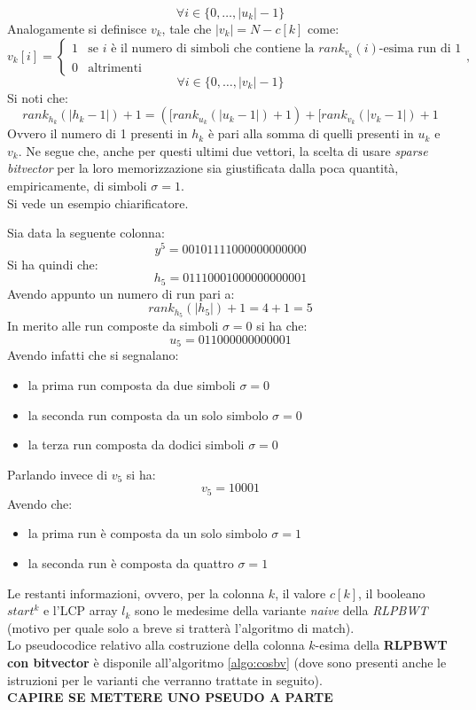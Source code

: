 \vspace{-5mm}
\[\forall i\in\{0,\ldots,|u_k|-1\}\]
Analogamente si definisce $v_k$, tale che $|v_k|=N-c[k]$ come:
\[v_k[i]=
  \begin{cases}
    1&\mbox{se }i \mbox{ è il numero di simboli che contiene la
    }rank_{v_k}(i)\mbox{-esima run di 1}\\
    0&\mbox{altrimenti}
  \end{cases},
\]
\vspace{-5mm}
\[\forall i\in\{0,\ldots,|v_k|-1\}\]
Si noti che:
\[rank_{h_k}(|h_k-1|)+1=([rank_{u_k}(|u_k-1|)+1)+[rank_{v_k}(|v_k-1|)+1\]
Ovvero il numero di 1 presenti in $h_k$ è pari alla somma di quelli presenti in
$u_k$ e $v_k$. Ne segue che, anche per questi ultimi due vettori, la scelta di
usare \textit{sparse bitvector} per la loro memorizzazione sia giustificata
dalla poca quantità, empiricamente, di simboli $\sigma=1$.\\
Si vede un esempio chiarificatore.
\begin{esempio}
  Sia data la seguente colonna:
  \[y^5=00101111000000000000\]
  Si ha quindi che:
  \[h_5=01110001000000000001\]
  Avendo appunto un numero di run pari a:
  \[rank_{h_5}(|h_5|)+1=4+1=5\]
  In merito alle run composte da simboli $\sigma=0$ si ha che:
  \[u_5=011000000000001\]
  Avendo infatti che si segnalano:
  \begin{itemize}
    \item la prima run composta da due simboli $\sigma=0$
    \item la seconda run composta da un solo simbolo $\sigma=0$
    \item la terza run composta da dodici simboli $\sigma=0$
  \end{itemize}
  Parlando invece di $v_5$ si ha:
  \[v_5=10001\]
  Avendo che:
  \begin{itemize}
    \item la prima run è composta da un solo simbolo $\sigma=1$
    \item la seconda run è composta da quattro $\sigma=1$
  \end{itemize}
\end{esempio}
Le restanti informazioni, ovvero, per la colonna $k$, il valore $c[k]$, il
booleano $start^k$ e l'LCP array $l_k$ sono le medesime della variante
\textit{naive} della \textit{RLPBWT} (motivo per quale solo a breve si
tratterà l'algoritmo di match).\\
Lo pseudocodice relativo alla costruzione della colonna $k$-esima della
\textbf{RLPBWT con bitvector} è disponile all'algoritmo \ref{algo:cosbv} (dove
sono presenti anche le istruzioni per le varianti che verranno trattate in
seguito).\\
\textbf{CAPIRE SE METTERE UNO PSEUDO A PARTE}